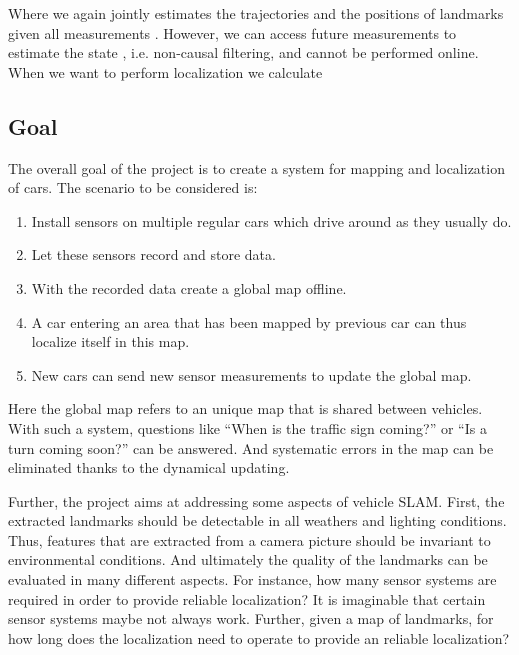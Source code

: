 Where we again jointly estimates the trajectories  and the positions
of landmarks  given all measurements . However, we can access future
measurements to estimate the state , i.e. non-causal filtering, and
cannot be performed online. When we want to perform localization we
calculate


\subsection{Goal}

The overall goal of the project is to create a system for mapping and
localization of cars. The scenario to be considered is:
\begin{enumerate}
\item  Install sensors on multiple regular cars which drive around as
  they usually do.
\item Let these sensors record and store data.
\item With the recorded data create a global map offline.
\item A car entering an area that has been mapped by previous car can
  thus localize itself in this map.
\item New cars can send new sensor measurements to update the global
  map.
\end{enumerate}

Here the global map refers to an unique map that is shared between
vehicles. With such a system, questions like ``When is the traffic sign
coming?'' or  ``Is a turn coming soon?'' can be answered. And systematic
errors in the map can be eliminated thanks to the dynamical updating.


Further, the project aims at addressing some aspects of vehicle
\gls{SLAM}. First, the extracted landmarks should be detectable in all
weathers and lighting conditions. Thus, features that are extracted
from a camera picture should be invariant to environmental
conditions. And ultimately the quality of the landmarks can be
evaluated in many different aspects. For instance, how many sensor
systems are required in order to provide reliable localization? It is
imaginable that certain sensor systems maybe not always work. Further,
given a map of landmarks, for how long does the localization need to
operate to provide an reliable localization?

